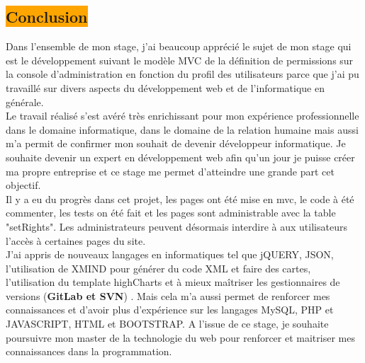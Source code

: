 \begin{center}
\section{\colorbox{orange}{Conclusion}}
\end{center}
\begin{spacing}{1.3}
Dans l'ensemble de mon stage, j'ai beaucoup apprécié le sujet de mon stage qui est le développement suivant le modèle MVC de la définition de permissions sur la console d'administration en fonction du profil des utilisateurs parce que j'ai pu travaillé sur divers aspects du développement web et de l'informatique en générale.\\[0.5cm]
Le travail réalisé s'est avéré très enrichissant pour mon expérience professionnelle dans le domaine informatique, dans le domaine de la relation humaine mais aussi m'a permit de confirmer mon souhait de devenir développeur informatique. Je souhaite devenir un expert en développement web afin qu'un jour je puisse créer ma propre entreprise et ce stage me permet d'atteindre une grande part cet objectif.\\[0.5cm]
Il y a eu du progrès dans cet projet, les pages ont été mise en mvc, le code à été commenter, les tests on été fait et les pages sont administrable avec la table "setRights". Les administrateurs peuvent désormais interdire à aux utilisateurs l'accès à certaines pages du site.\\[0.5cm]
 J'ai appris de nouveaux langages en informatiques tel que jQUERY, JSON, l'utilisation de XMIND pour générer du code XML et faire des cartes, l'utilisation du template highCharts et à mieux maîtriser les gestionnaires de versions (\textbf{GitLab et SVN}) . Mais cela m'a aussi permet de renforcer mes connaissances et d'avoir plus d'expérience sur les langages MySQL, PHP et JAVASCRIPT, HTML et BOOTSTRAP. 
A l'issue de ce stage, je souhaite poursuivre mon master de la technologie du web pour renforcer et maitriser mes connaissances dans la programmation. 
\end{spacing}
 